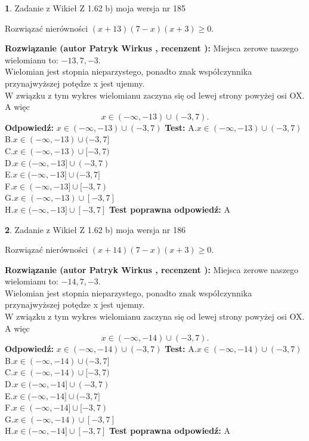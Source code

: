 \documentclass[12pt, a4paper]{article}
\theoremstyle{definition} %
\newtheorem{zad}{}
\newcommand{\zadStart}[1]{\begin{zad}#1\newline}
\newcommand{\zadStop}{\end{zad}}
\newcommand{\rozwStart}[2]{\noindent \textbf{Rozwiązanie (autor #1 , recenzent #2): }\newline}
\newcommand{\rozwStop}{\newline}
\newcommand{\odpStart}{\noindent \textbf{Odpowiedź:}\newline}
\newcommand{\odpStop}{\newline}
\newcommand{\testStart}{\noindent \textbf{Test:}\newline}
\newcommand{\testStop}{\newline}
\newcommand{\kluczStart}{\noindent \textbf{Test poprawna odpowiedź:}\newline}
\newcommand{\kluczStop}{\newline}
\begin{document}
\zadStart{Zadanie z Wikieł Z 1.62 b) moja wersja nr 185}

Rozwiązać nierówności $(x+13)(7-x)(x+3)\ge0$.
\zadStop
\rozwStart{Patryk Wirkus}{}
Miejsca zerowe naszego wielomianu to: $-13, 7, -3$.\\
Wielomian jest stopnia nieparzystego, ponadto znak współczynnika przy\linebreak najwyższej potędze x jest ujemny.\\ W związku z tym wykres wielomianu zaczyna się od lewej strony powyżej osi OX. A więc $$x \in (-\infty,-13) \cup (-3,7).$$
\rozwStop
\odpStart
$x \in (-\infty,-13) \cup (-3,7)$
\odpStop
\testStart
A.$x \in (-\infty,-13) \cup (-3,7)$\\
B.$x \in (-\infty,-13) \cup (-3,7]$\\
C.$x \in (-\infty,-13) \cup [-3,7)$\\
D.$x \in (-\infty,-13] \cup (-3,7)$\\
E.$x \in (-\infty,-13] \cup (-3,7]$\\
F.$x \in (-\infty,-13] \cup [-3,7)$\\
G.$x \in (-\infty,-13) \cup [-3,7]$\\
H.$x \in (-\infty,-13] \cup [-3,7]$
\testStop
\kluczStart
A
\kluczStop



\zadStart{Zadanie z Wikieł Z 1.62 b) moja wersja nr 186}

Rozwiązać nierówności $(x+14)(7-x)(x+3)\ge0$.
\zadStop
\rozwStart{Patryk Wirkus}{}
Miejsca zerowe naszego wielomianu to: $-14, 7, -3$.\\
Wielomian jest stopnia nieparzystego, ponadto znak współczynnika przy\linebreak najwyższej potędze x jest ujemny.\\ W związku z tym wykres wielomianu zaczyna się od lewej strony powyżej osi OX. A więc $$x \in (-\infty,-14) \cup (-3,7).$$
\rozwStop
\odpStart
$x \in (-\infty,-14) \cup (-3,7)$
\odpStop
\testStart
A.$x \in (-\infty,-14) \cup (-3,7)$\\
B.$x \in (-\infty,-14) \cup (-3,7]$\\
C.$x \in (-\infty,-14) \cup [-3,7)$\\
D.$x \in (-\infty,-14] \cup (-3,7)$\\
E.$x \in (-\infty,-14] \cup (-3,7]$\\
F.$x \in (-\infty,-14] \cup [-3,7)$\\
G.$x \in (-\infty,-14) \cup [-3,7]$\\
H.$x \in (-\infty,-14] \cup [-3,7]$
\testStop
\kluczStart
A
\kluczStop
\end{document}
